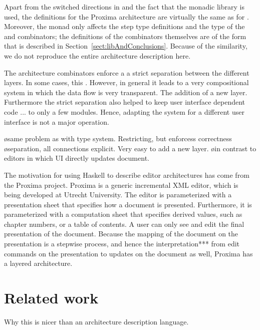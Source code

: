 \documentclass[preprint,natbib]{sigplanconf}
\begin{document}
Apart from the switched directions in  and the fact that the monadic library is used, the definitions for the Proxima architecture are virtually the same as for . Moreover, the monad only affects the step type definitions and the type of the  and  combinators; the definitions of the combinators themselves are of the form that is described in Section~\ref{sect:libAndConclusions}. Because of the similarity, we do not reproduce the entire architecture description here.

\bc
\bigskip

The architecture combinators enforce a a strict separation between the different layers. In some cases, this . However, in general it leads to a very compositional system in which the data flow is very transparent. The addition of a new layer. Furthermore the strict separation also helped to keep user interface dependent code ... to only a few modules. Hence, adapting the system for a different user interface is not a major operation.

\bl
\o same problem as with type system. Restricting, but enforcess correctness
\o separation, all connections explicit. Very easy to add a new layer. 
\o in contrast to editors in which UI directly updates document.
\el
\ec

\bc
The motivation for using Haskell to describe editor architectures has come from the Proxima project. Proxima is a generic incremental XML editor, which is being developed at Utrecht University. The editor is parameterized with a presentation sheet that specifies how a document is presented. Furthermore, it is parameterized with a computation sheet that specifies derived values, such as chapter numbers, or a table of contents. A user can only see and edit the final presentation of the document. Because the mapping of the document on the presentation is a stepwise process, and hence the interpretation*** from edit commands on the presentation to updates on the document as well, Proxima has a layered architecture.
\ec



%																
%																
%																
\section{Related work} \label{sect:relatedWork}

Why this is nicer than an architecture description language.


%																
%																
%																
\end{document}
